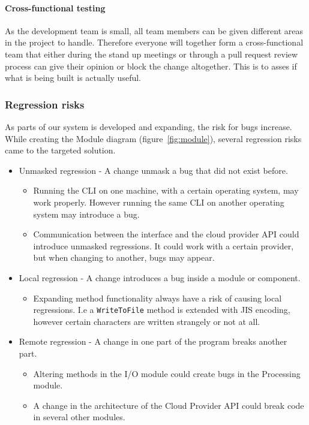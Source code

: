 \documentclass[a4paper,15pt,twoside]{article}
\begin{document}
\paragraph*{Cross-functional testing}
As the development team is small, all team members can be given different areas in the project to handle. Therefore everyone will together form a cross-functional team that either during the stand up meetings or through a pull request review process can give their opinion or block the change altogether. This is to asses if what is being built is actually useful.

\subsubsection{Regression risks} 
As parts of our system is developed and expanding, the risk for bugs increase. While creating the Module diagram (figure~\ref{fig:module}), several regression risks came to the targeted solution. 
\begin{itemize}  
\item Unmasked regression - A change unmask a bug that did not exist before.
\begin{itemize}
    \item Running the CLI on one machine, with a certain operating system, may work properly. However running the same CLI on another operating system may introduce a bug.
    \item Communication between the interface and the cloud provider API could introduce unmasked regressions. It could work with a certain provider, but when changing to another, bugs may appear.
\end{itemize}
\item Local regression - A change introduces a bug inside a module or component.
\begin{itemize}
    \item Expanding method functionality always have a risk of causing local regressions. I.e a \texttt{WriteToFile} method is extended with JIS encoding, however certain characters are written strangely or not at all.
\end{itemize}
\item Remote regression - A change in one part of the program breaks another part.
\begin{itemize}
    \item Altering methods in the I/O module could create bugs in the Processing module.
    \item A change in the architecture of the Cloud Provider API could break code in several other modules.
\end{itemize}
\end{itemize}
\end{document}
